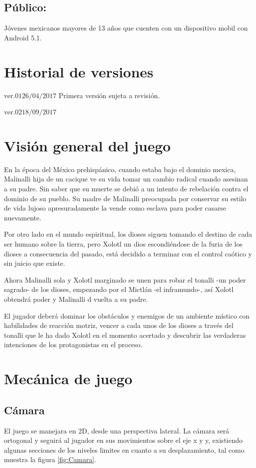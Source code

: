 \documentclass[11pt,letterpaper]{article}
\begin{document}
\subsection{Público:}
Jóvenes mexicanos mayores de 13 años que cuenten con un dispositivo mobil con Android 5.1.
\section{Historial de versiones}
ver.$01 26/04/2017$ Primera versión sujeta a revisión.
\\
\par
ver.$02 18/09/2017$ 
\section{Visión general del juego}
En la época del México prehispánico, cuando estaba bajo el dominio mexica, Malinalli hija de un cacique ve su vida tomar un cambio radical cuando asesinan a su padre. Sin saber que su muerte se debió a un intento de rebelación contra el dominio de su pueblo. Su madre de Malinalli preocupada por conservar su estilo de vida lujoso apresuradamente la vende como esclava para poder casarse nuevamente.

Por otro lado en el mundo espiritual, los dioses siguen tomando el destino de cada ser humano sobre la tierra, pero Xolotl un dios escondiéndose de la furia de los dioses a consecuencia del pasado, está decidido a terminar con el control caótico y sin juicio que existe.

Ahora Malinalli sola y Xolotl marginado se unen para robar el tonalli -un poder sagrado- de los dioses, empezando por el Mictlán -el inframundo-, así Xolotl obtendrá poder y Malinalli d vuelta a su padre.

El jugador deberá dominar los obstáculos y enemigos de un ambiente místico con habilidades de reacción motriz, vencer a cada unos de los dioses a través del tonalli que le ha dado Xolotl en el momento acertado y descubrir las verdaderas intenciones de los protagonistas en el proceso.

\section{Mecánica de juego}
	\subsection{Cámara}
El juego se manejara en 2D, desde una perspectiva lateral. La cámara será ortogonal y seguirá al jugador en sus movimientos sobre el eje x y y, existiendo algunas secciones de los niveles limites en cuanto a su desplazamiento, tal como muestra la figura \ref{fig:Camara}. 
\end{document}
